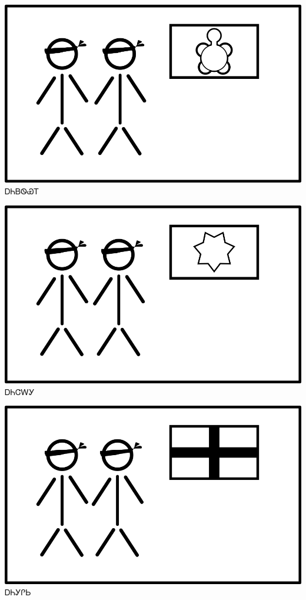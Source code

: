 \documentclass[avery5371]{flashcards}%
\begin{document}

\begin{flashcard}{
\includegraphics[width=0.95\columnwidth,height=.51\columnwidth,keepaspectratio]{../artwork/flags/anidaksi-flag-blind}
}\Huge ᎠᏂᏴᏫᏯᎢ
\end{flashcard}

\begin{flashcard}{
\includegraphics[width=0.95\columnwidth,height=.51\columnwidth,keepaspectratio]{../artwork/flags/anijalagi-flag-blind}
}\Huge ᎠᏂᏣᎳᎩ
\end{flashcard}

\begin{flashcard}{
\includegraphics[width=0.95\columnwidth,height=.51\columnwidth,keepaspectratio]{../artwork/flags/anigilisi-flag-blind}
}\Huge ᎠᏂᎩᎵᏏ
\end{flashcard}
\end{document}
